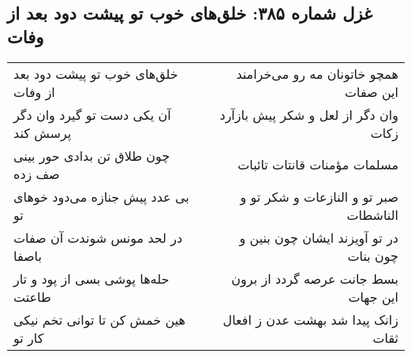 \begin{center}
\section*{غزل شماره ۳۸۵: خلق‌های خوب تو پیشت دود بعد از وفات}
\label{sec:0385}
\begin{longtable}{l p{0.5cm} r}
خلق‌های خوب تو پیشت دود بعد از وفات
&&
همچو خاتونان مه رو می‌خرامند این صفات
\\
آن یکی دست تو گیرد وان دگر پرسش کند
&&
وان دگر از لعل و شکر پیش بازآرد زکات
\\
چون طلاق تن بدادی حور بینی صف زده
&&
مسلمات مؤمنات قانتات تائبات
\\
بی عدد پیش جنازه می‌دود خوهای تو
&&
صبر تو و النازعات و شکر تو و الناشطات
\\
در لحد مونس شوندت آن صفات باصفا
&&
در تو آویزند ایشان چون بنین و چون بنات
\\
حله‌ها پوشی بسی از پود و تار طاعتت
&&
بسط جانت عرصه گردد از برون این جهات
\\
هین خمش کن تا توانی تخم نیکی کار تو
&&
زانک پیدا شد بهشت عدن ز افعال ثقات
\\
\end{longtable}
\end{center}
